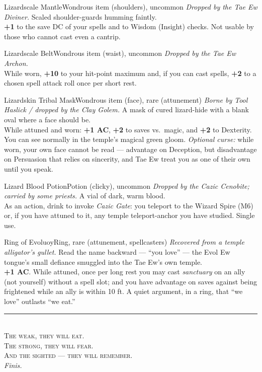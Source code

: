 \documentclass[10pt,twoside]{article}
\begin{document}
\begin{itemcard}{Lizardscale Mantle}{Wondrous item (shoulders), uncommon}
\emph{Dropped by the Tae Ew Diviner.} Scaled shoulder-guards humming faintly. \\
\textbf{+1} to the save DC of your spells and to Wisdom (Insight) checks. Not usable by
those who cannot cast even a cantrip.
\end{itemcard}

\begin{itemcard}{Lizardscale Belt}{Wondrous item (waist), uncommon}
\emph{Dropped by the Tae Ew Archon.} \\
While worn, \textbf{+10} to your hit-point maximum and, if you can cast spells,
\textbf{+2} to a chosen spell attack roll once per short rest.
\end{itemcard}

\begin{itemcard}{Lizardskin Tribal Mask}{Wondrous item (face), rare (attunement)}
\emph{Borne by Tool Haslick / dropped by the Clay Golem.} A mask of cured lizard-hide
with a blank oval where a face should be. \\
While attuned and worn: \textbf{+1 AC}, \textbf{+2} to saves vs.\ magic, and \textbf{+2}
to Dexterity. You can see normally in the temple's magical green gloom. \emph{Optional
curse:} while worn, your own face cannot be read --- advantage on Deception, but
disadvantage on Persuasion that relies on sincerity, and Tae Ew treat you as one of
their own until you speak.
\end{itemcard}

\begin{itemcard}{Lizard Blood Potion}{Potion (clicky), uncommon}
\emph{Dropped by the Cazic Cenobite; carried by some priests.} A vial of dark, warm
blood. \\
As an action, drink to invoke \emph{Cazic Gate}: you teleport to the Wizard Spire (M6)
or, if you have attuned to it, any temple teleport-anchor you have studied. Single use.
\end{itemcard}

\begin{itemcard}{Ring of Evoluoy}{Ring, rare (attunement, spellcasters)}
\emph{Recovered from a temple alligator's gullet.} Read the name backward --- ``you
love'' --- the Evol Ew tongue's small defiance smuggled into the Tae Ew's own temple. \\
\textbf{+1 AC}. While attuned, once per long rest you may cast \emph{sanctuary} on an
ally (not yourself) without a spell slot; and you have advantage on saves against being
frightened while an ally is within 10 ft. A quiet argument, in a ring, that ``we love''
outlasts ``we eat.''
\end{itemcard}

\vfill
\begin{center}
\rule{0.5\textwidth}{0.5pt}\\[0.2in]
{\scshape\color{templegreen} The weak, they will eat.}\\
{\scshape\color{bloodred} The strong, they will fear.}\\
{\scshape\color{stone} And the sighted --- they will remember.}\\[0.2in]
{\footnotesize\color{stone} \textit{Finis.}}
\end{center}
\end{document}
